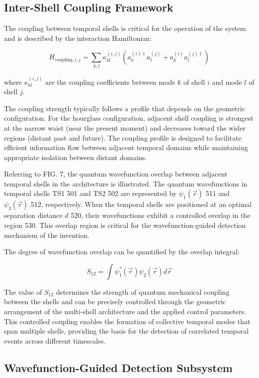 \documentclass[12pt,letterpaper]{article}
\begin{document}
\subsection{Inter-Shell Coupling Framework}

The coupling between temporal shells is critical for the operation of the system and is described by the interaction Hamiltonian:

$$H_{\text{coupling},i,j} = \sum_{k,l} \kappa_{kl}^{(i,j)} (a_k^{(i)\dagger} a_l^{(j)} + a_k^{(i)} a_l^{(j)\dagger})$$

where $\kappa_{kl}^{(i,j)}$ are the coupling coefficients between mode $k$ of shell $i$ and mode $l$ of shell $j$.

The coupling strength typically follows a profile that depends on the geometric configuration. For the hourglass configuration, adjacent shell coupling is strongest at the narrow waist (near the present moment) and decreases toward the wider regions (distant past and future). The coupling profile is designed to facilitate efficient information flow between adjacent temporal domains while maintaining appropriate isolation between distant domains.

Referring to FIG. 7, the quantum wavefunction overlap between adjacent temporal shells in the architecture is illustrated. The quantum wavefunctions in temporal shells TS1 501 and TS2 502 are represented by $\psi_1(\vec{r})$ 511 and $\psi_2(\vec{r})$ 512, respectively. When the temporal shells are positioned at an optimal separation distance $d$ 520, their wavefunctions exhibit a controlled overlap in the region 530. This overlap region is critical for the wavefunction-guided detection mechanism of the invention.

The degree of wavefunction overlap can be quantified by the overlap integral:

$$S_{12} = \int \psi_1^*(\vec{r})\psi_2(\vec{r})d\vec{r}$$

The value of $S_{12}$ determines the strength of quantum mechanical coupling between the shells and can be precisely controlled through the geometric arrangement of the multi-shell architecture and the applied control parameters. This controlled coupling enables the formation of collective temporal modes that span multiple shells, providing the basis for the detection of correlated temporal events across different timescales.

\subsection{Wavefunction-Guided Detection Subsystem}
\end{document}
